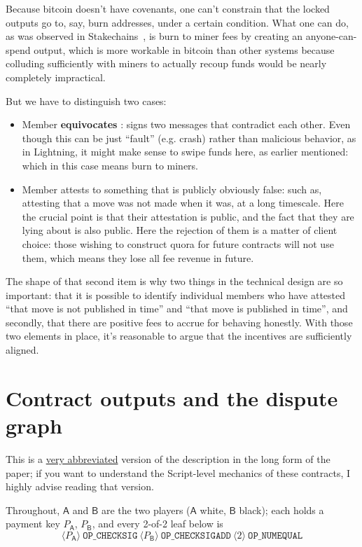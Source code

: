 \documentclass[11pt]{article}
\newcommand{\op}[1]{\texttt{OP\_#1}}
\newcommand{\push}[1]{\ensuremath{\langle #1\rangle}}
\newcommand{\Pa}{\mathsf{A}}
\newcommand{\Pb}{\mathsf{B}}
\begin{document}
Because bitcoin doesn't have covenants, one can't constrain that the locked outputs go to, say, burn addresses, under a certain condition. What one can do, as was observed in Stakechains~\cite{coins}, is burn to miner fees by creating an anyone-can-spend output, which is more workable in bitcoin than other systems because colluding sufficiently with miners to actually recoup funds would be nearly completely impractical.

But we have to distinguish two cases:

\begin{itemize}
\item Member \textbf{equivocates} : signs two messages that contradict each other. Even though this can be just ``fault'' (e.g. crash) rather than malicious behavior, as in Lightning, it might make sense to swipe funds here, as earlier mentioned: which in this case means burn to miners.
\item Member attests to something that is publicly obviously false: such as, attesting that a move was not made when it was, at a long timescale. Here the crucial point is that their attestation is public, and the fact that they are lying about is also public. Here the rejection of them is a matter of client choice: those wishing to construct quora for future contracts will not use them, which means they lose all fee revenue in future.
\end{itemize}

The shape of that second item is why two things in the technical design are so important: that it is possible to identify individual members who have attested ``that move is not published in time'' and ``that move is published in time'', and secondly, that there are positive fees to accrue for behaving honestly. With those two elements in place, it's reasonable to argue that the incentives are sufficiently aligned.

\section{Contract outputs and the dispute graph}
\label{sec:graph}

This is a \underline{very abbreviated} version of the description in the long form of the paper; if you want to understand the Script-level mechanics of these contracts, I highly advise reading that version.

Throughout, $\Pa$ and $\Pb$ are the two players ($\Pa$
white, $\Pb$ black); each holds a payment key $P_\Pa$, $P_\Pb$, and every 2-of-2 leaf below is
\[
  \push{P_\Pa}\ \op{CHECKSIG}\ \push{P_\Pb}\ \op{CHECKSIGADD}\ \push{2}\ \op{NUMEQUAL}
\]
\end{document}
